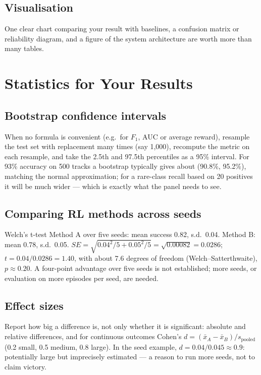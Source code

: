 \documentclass[11pt]{article}
\begin{document}
\subsection{Visualisation}
One clear chart comparing your result with baselines, a confusion matrix or reliability diagram, and a figure of the system architecture are worth more than many tables.

\section{Statistics for Your Results}
\subsection{Bootstrap confidence intervals}
When no formula is convenient (e.g.\ for $F_1$, AUC or average reward), resample the test set with replacement many times (say 1,000), recompute the metric on each resample, and take the 2.5th and 97.5th percentiles as a 95\% interval. For 93\% accuracy on 500 tracks a bootstrap typically gives about (90.8\%, 95.2\%), matching the normal approximation; for a rare-class recall based on 20 positives it will be much wider --- which is exactly what the panel needs to see.

\subsection{Comparing RL methods across seeds}
\begin{example}{Welch's t-test}
Method A over five seeds: mean success 0.82, s.d.\ 0.04. Method B: mean 0.78, s.d.\ 0.05. $SE=\sqrt{0.04^2/5+0.05^2/5}=\sqrt{0.00082}=0.0286$; $t=0.04/0.0286=1.40$, with about 7.6 degrees of freedom (Welch--Satterthwaite), $p\approx0.20$. A four-point advantage over five seeds is not established; more seeds, or evaluation on more episodes per seed, are needed.
\end{example}

\subsection{Effect sizes}
Report how big a difference is, not only whether it is significant: absolute and relative differences, and for continuous outcomes Cohen's $d=(\bar x_A-\bar x_B)/s_{\text{pooled}}$ (0.2 small, 0.5 medium, 0.8 large). In the seed example, $d=0.04/0.045\approx0.9$: potentially large but imprecisely estimated --- a reason to run more seeds, not to claim victory.
\end{document}
